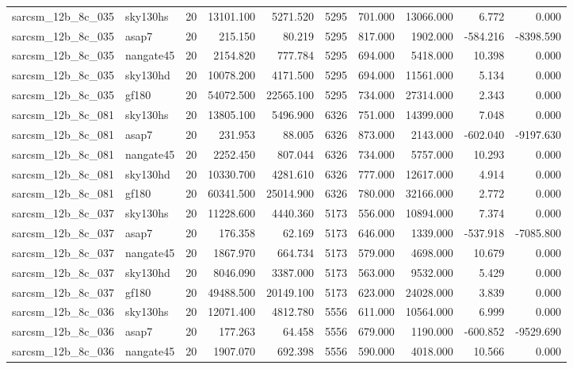 \documentclass{article}
\begin{document}
\begin{longtable}{llrrrrrrrr}
sarcsm\_12b\_8c\_035 & sky130hs & 20 & 13101.100 & 5271.520 & 5295 & 701.000 & 13066.000 & 6.772 & 0.000 \\
sarcsm\_12b\_8c\_035 & asap7 & 20 & 215.150 & 80.219 & 5295 & 817.000 & 1902.000 & -584.216 & -8398.590 \\
sarcsm\_12b\_8c\_035 & nangate45 & 20 & 2154.820 & 777.784 & 5295 & 694.000 & 5418.000 & 10.398 & 0.000 \\
sarcsm\_12b\_8c\_035 & sky130hd & 20 & 10078.200 & 4171.500 & 5295 & 694.000 & 11561.000 & 5.134 & 0.000 \\
sarcsm\_12b\_8c\_035 & gf180 & 20 & 54072.500 & 22565.100 & 5295 & 734.000 & 27314.000 & 2.343 & 0.000 \\
sarcsm\_12b\_8c\_081 & sky130hs & 20 & 13805.100 & 5496.900 & 6326 & 751.000 & 14399.000 & 7.048 & 0.000 \\
sarcsm\_12b\_8c\_081 & asap7 & 20 & 231.953 & 88.005 & 6326 & 873.000 & 2143.000 & -602.040 & -9197.630 \\
sarcsm\_12b\_8c\_081 & nangate45 & 20 & 2252.450 & 807.044 & 6326 & 734.000 & 5757.000 & 10.293 & 0.000 \\
sarcsm\_12b\_8c\_081 & sky130hd & 20 & 10330.700 & 4281.610 & 6326 & 777.000 & 12617.000 & 4.914 & 0.000 \\
sarcsm\_12b\_8c\_081 & gf180 & 20 & 60341.500 & 25014.900 & 6326 & 780.000 & 32166.000 & 2.772 & 0.000 \\
sarcsm\_12b\_8c\_037 & sky130hs & 20 & 11228.600 & 4440.360 & 5173 & 556.000 & 10894.000 & 7.374 & 0.000 \\
sarcsm\_12b\_8c\_037 & asap7 & 20 & 176.358 & 62.169 & 5173 & 646.000 & 1339.000 & -537.918 & -7085.800 \\
sarcsm\_12b\_8c\_037 & nangate45 & 20 & 1867.970 & 664.734 & 5173 & 579.000 & 4698.000 & 10.679 & 0.000 \\
sarcsm\_12b\_8c\_037 & sky130hd & 20 & 8046.090 & 3387.000 & 5173 & 563.000 & 9532.000 & 5.429 & 0.000 \\
sarcsm\_12b\_8c\_037 & gf180 & 20 & 49488.500 & 20149.100 & 5173 & 623.000 & 24028.000 & 3.839 & 0.000 \\
sarcsm\_12b\_8c\_036 & sky130hs & 20 & 12071.400 & 4812.780 & 5556 & 611.000 & 10564.000 & 6.999 & 0.000 \\
sarcsm\_12b\_8c\_036 & asap7 & 20 & 177.263 & 64.458 & 5556 & 679.000 & 1190.000 & -600.852 & -9529.690 \\
sarcsm\_12b\_8c\_036 & nangate45 & 20 & 1907.070 & 692.398 & 5556 & 590.000 & 4018.000 & 10.566 & 0.000 \\

\end{longtable}
\end{document}
